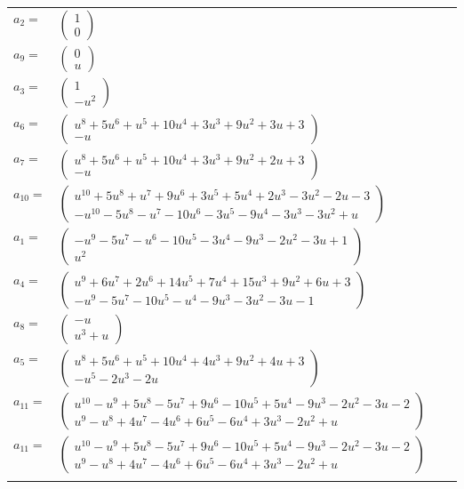 \documentclass[1p]{elsarticle_modified}
\theoremstyle{definition}
\begin{document}
\begin{tabular}{m{7pt} m{180pt} m{7pt} m{180pt} }
\flushright $a_{2}=$&$\begin{pmatrix}1\\0\end{pmatrix}$ \\
\flushright $a_{9}=$&$\begin{pmatrix}0\\u\end{pmatrix}$ \\
\flushright $a_{3}=$&$\begin{pmatrix}1\\- u^2\end{pmatrix}$ \\
\flushright $a_{6}=$&$\begin{pmatrix}u^8+5 u^6+u^5+10 u^4+3 u^3+9 u^2+3 u+3\\- u\end{pmatrix}$ \\
\flushright $a_{7}=$&$\begin{pmatrix}u^8+5 u^6+u^5+10 u^4+3 u^3+9 u^2+2 u+3\\- u\end{pmatrix}$ \\
\flushright $a_{10}=$&$\begin{pmatrix}u^{10}+5 u^8+u^7+9 u^6+3 u^5+5 u^4+2 u^3-3 u^2-2 u-3\\- u^{10}-5 u^8- u^7-10 u^6-3 u^5-9 u^4-3 u^3-3 u^2+u\end{pmatrix}$ \\
\flushright $a_{1}=$&$\begin{pmatrix}- u^9-5 u^7- u^6-10 u^5-3 u^4-9 u^3-2 u^2-3 u+1\\u^2\end{pmatrix}$ \\
\flushright $a_{4}=$&$\begin{pmatrix}u^9+6 u^7+2 u^6+14 u^5+7 u^4+15 u^3+9 u^2+6 u+3\\- u^9-5 u^7-10 u^5- u^4-9 u^3-3 u^2-3 u-1\end{pmatrix}$ \\
\flushright $a_{8}=$&$\begin{pmatrix}- u\\u^3+u\end{pmatrix}$ \\
\flushright $a_{5}=$&$\begin{pmatrix}u^8+5 u^6+u^5+10 u^4+4 u^3+9 u^2+4 u+3\\- u^5-2 u^3-2 u\end{pmatrix}$ \\
\flushright $a_{11}=$&$\begin{pmatrix}u^{10}- u^9+5 u^8-5 u^7+9 u^6-10 u^5+5 u^4-9 u^3-2 u^2-3 u-2\\u^9- u^8+4 u^7-4 u^6+6 u^5-6 u^4+3 u^3-2 u^2+u\end{pmatrix}$\\ \flushright $a_{11}=$&$\begin{pmatrix}u^{10}- u^9+5 u^8-5 u^7+9 u^6-10 u^5+5 u^4-9 u^3-2 u^2-3 u-2\\u^9- u^8+4 u^7-4 u^6+6 u^5-6 u^4+3 u^3-2 u^2+u\end{pmatrix}$\\&\end{tabular}
\end{document}
